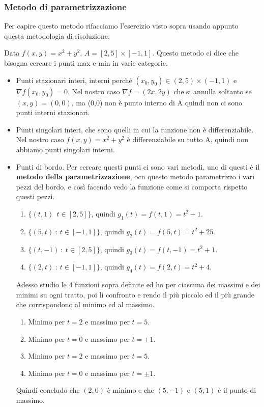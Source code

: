 \subsubsection{Metodo di parametrizzazione}
Per capire questo metodo rifacciamo l'esercizio visto sopra usando appunto questa metodologia di risoluzione.
\begin{example}
Data $f(x,y) = x^2 + y^2$, $A = [2,5] \times [-1,1]$. Questo metodo ci dice che bisogna cercare i punti max e min in varie categorie.
\begin{itemize}
    \item Punti stazionari interi, interni perché $(x_0,y_0) \in (2,5) \times (-1,1)$ e $\nabla f(x_0,y_0) = 0$. Nel nostro caso $\nabla f = (2x, 2y)$ che si annulla soltanto se $(x,y) = (0,0)$, ma (0,0) non è punto interno di A quindi non ci sono punti interni stazionari.
    \item Punti singolari interi, che sono quelli in cui la funzione non è differenziabile. Nel nostro caso $f(x,y) = x^2 + y^2$ è differenziabile su tutto A, quindi non abbiamo punti singolari interni.
    \item Punti di bordo. Per cercare questi punti ci sono vari metodi, uno di questi è il \textbf{metodo della parametrizzazione}, ocn questo metodo parametrizzo i vari pezzi del bordo, e così facendo vedo la funzione come si comporta rispetto questi pezzi.
    \begin{enumerate}
        \item $\{(t,1) \:\: t \in [2,5]\}$, quindi $g_1(t) = f(t,1) = t^2 +1$.
        \item $\{(5,t) \::\: t \in [-1,1]\}$, quindi $g_2(t) = f(5,t) = t^2 + 25$.
        \item $\{(t,-1) \::\: t \in [2,5]\}$, quindi $g_3(t) = f(t,-1) = t^2 + 1$.
        \item $\{(2,t) \::\: t \in [-1,1]\}$, quindi $g_4(t) = f(2,t) = t^2 + 4$.
    \end{enumerate}
    Adesso studio le 4 funzioni sopra definite ed ho per ciascuna dei massimi e dei minimi su ogni tratto, poi li confronto e rendo il più piccolo ed il più grande che corrispondono al minimo ed al massimo.
    \begin{enumerate}
        \item Minimo per $t=2$ e massimo per $t = 5$.
        \item Minimo per $t=0$ e massimo per $t = \pm 1$.
        \item Minimo per $t=2$ e massimo per $t = 5$.
        \item Minimo per $t=0$ e massimo per $t = \pm 1$.
    \end{enumerate}
    Quindi concludo che $(2,0)$ è minimo e che $(5,-1)$ e $(5,1)$ è il punto di massimo.
\end{itemize}
\end{example}

